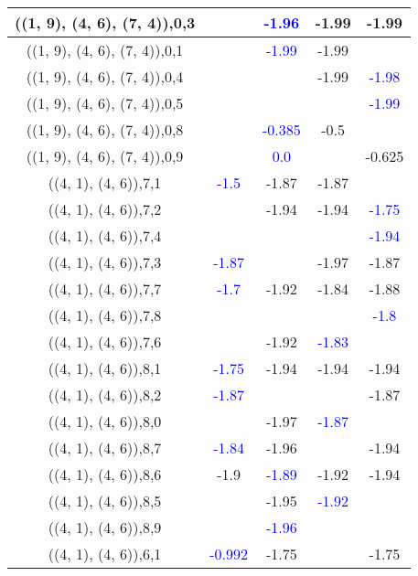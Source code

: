 \documentclass{article}
\begin{document}
\begin{center}
\begin{longtable}{|c|c|c|c|c|}
        	\hline
        	((1, 9), (4, 6), (7, 4)),0,3&& \textcolor{blue}{-1.96}&-1.99&-1.99\\
        	\hline
        	((1, 9), (4, 6), (7, 4)),0,1&& \textcolor{blue}{-1.99}&-1.99&\\
        	\hline
        	((1, 9), (4, 6), (7, 4)),0,4&&&-1.99& \textcolor{blue}{-1.98}\\
        	\hline
        	((1, 9), (4, 6), (7, 4)),0,5&&&& \textcolor{blue}{-1.99}\\
        	\hline
        	((1, 9), (4, 6), (7, 4)),0,8&& \textcolor{blue}{-0.385}&-0.5&\\
        	\hline
        	((1, 9), (4, 6), (7, 4)),0,9&& \textcolor{blue}{0.0}&&-0.625\\
        	\hline
        	((4, 1), (4, 6)),7,1& \textcolor{blue}{-1.5}&-1.87&-1.87&\\
        	\hline
        	((4, 1), (4, 6)),7,2&&-1.94&-1.94& \textcolor{blue}{-1.75}\\
        	\hline
        	((4, 1), (4, 6)),7,4&&&& \textcolor{blue}{-1.94}\\
        	\hline
        	((4, 1), (4, 6)),7,3& \textcolor{blue}{-1.87}&&-1.97&-1.87\\
        	\hline
        	((4, 1), (4, 6)),7,7& \textcolor{blue}{-1.7}&-1.92&-1.84&-1.88\\
        	\hline
        	((4, 1), (4, 6)),7,8&&&& \textcolor{blue}{-1.8}\\
        	\hline
        	((4, 1), (4, 6)),7,6&&-1.92& \textcolor{blue}{-1.83}&\\
        	\hline
        	((4, 1), (4, 6)),8,1& \textcolor{blue}{-1.75}&-1.94&-1.94&-1.94\\
        	\hline
        	((4, 1), (4, 6)),8,2& \textcolor{blue}{-1.87}&&&-1.87\\
        	\hline
        	((4, 1), (4, 6)),8,0&&-1.97& \textcolor{blue}{-1.87}&\\
        	\hline
        	((4, 1), (4, 6)),8,7& \textcolor{blue}{-1.84}&-1.96&&-1.94\\
        	\hline
        	((4, 1), (4, 6)),8,6&-1.9& \textcolor{blue}{-1.89}&-1.92&-1.94\\
        	\hline
        	((4, 1), (4, 6)),8,5&&-1.95& \textcolor{blue}{-1.92}&\\
        	\hline
        	((4, 1), (4, 6)),8,9&& \textcolor{blue}{-1.96}&&\\
        	\hline
        	((4, 1), (4, 6)),6,1& \textcolor{blue}{-0.992}&-1.75&&-1.75\\

\end{longtable}
\end{center}
\end{document}

